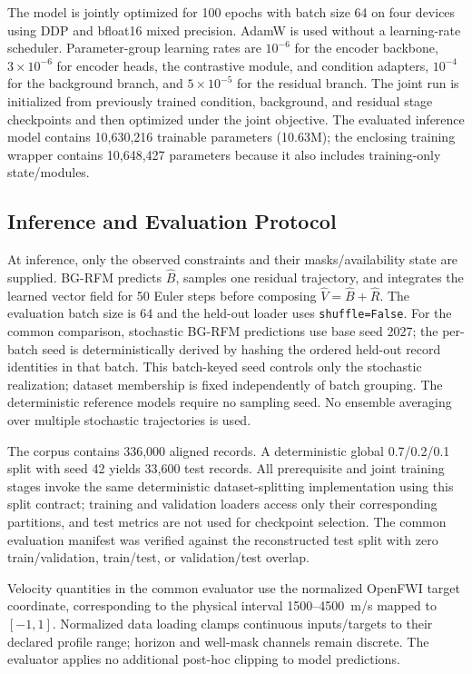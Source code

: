 The model is jointly optimized for 100 epochs with batch size 64 on four devices using DDP and bfloat16 mixed precision. AdamW is used without a learning-rate scheduler. Parameter-group learning rates are $10^{-6}$ for the encoder backbone, $3\times10^{-6}$ for encoder heads, the contrastive module, and condition adapters, $10^{-4}$ for the background branch, and $5\times10^{-5}$ for the residual branch. The joint run is initialized from previously trained condition, background, and residual stage checkpoints and then optimized under the joint objective. The evaluated inference model contains 10,630,216 trainable parameters (10.63M); the enclosing training wrapper contains 10,648,427 parameters because it also includes training-only state/modules.

\subsection{Inference and Evaluation Protocol}

At inference, only the observed constraints and their masks/availability state are supplied. BG-RFM predicts $\hat B$, samples one residual trajectory, and integrates the learned vector field for 50 Euler steps before composing $\hat V=\hat B+\hat R$. The evaluation batch size is 64 and the held-out loader uses \texttt{shuffle=False}. For the common comparison, stochastic BG-RFM predictions use base seed 2027; the per-batch seed is deterministically derived by hashing the ordered held-out record identities in that batch. This batch-keyed seed controls only the stochastic realization; dataset membership is fixed independently of batch grouping. The deterministic reference models require no sampling seed. No ensemble averaging over multiple stochastic trajectories is used.

The corpus contains 336,000 aligned records. A deterministic global 0.7/0.2/0.1 split with seed 42 yields 33,600 test records. All prerequisite and joint training stages invoke the same deterministic dataset-splitting implementation using this split contract; training and validation loaders access only their corresponding partitions, and test metrics are not used for checkpoint selection. The common evaluation manifest was verified against the reconstructed test split with zero train/validation, train/test, or validation/test overlap.

Velocity quantities in the common evaluator use the normalized OpenFWI target coordinate, corresponding to the physical interval 1500--4500~m/s mapped to $[-1,1]$. Normalized data loading clamps continuous inputs/targets to their declared profile range; horizon and well-mask channels remain discrete. The evaluator applies no additional post-hoc clipping to model predictions.

